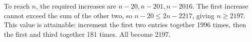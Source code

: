To reach $n$, the required increases are $n-20,n-201,n-2016$. The first increase cannot exceed the sum of the other two, so $n-20\le2n-2217$, giving $n\ge2197$. This value is attainable: increment the first two entries together 1996 times, then the first and third together 181 times. All become $\boxed{2197}$.
